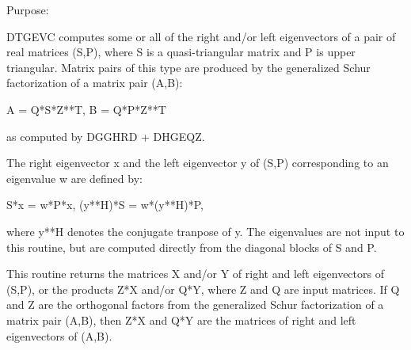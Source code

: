  \begin{DoxyParagraph}{Purpose\+: }
\begin{DoxyVerb} DTGEVC computes some or all of the right and/or left eigenvectors of
 a pair of real matrices (S,P), where S is a quasi-triangular matrix
 and P is upper triangular.  Matrix pairs of this type are produced by
 the generalized Schur factorization of a matrix pair (A,B):

    A = Q*S*Z**T,  B = Q*P*Z**T

 as computed by DGGHRD + DHGEQZ.

 The right eigenvector x and the left eigenvector y of (S,P)
 corresponding to an eigenvalue w are defined by:
 
    S*x = w*P*x,  (y**H)*S = w*(y**H)*P,
 
 where y**H denotes the conjugate tranpose of y.
 The eigenvalues are not input to this routine, but are computed
 directly from the diagonal blocks of S and P.
 
 This routine returns the matrices X and/or Y of right and left
 eigenvectors of (S,P), or the products Z*X and/or Q*Y,
 where Z and Q are input matrices.
 If Q and Z are the orthogonal factors from the generalized Schur
 factorization of a matrix pair (A,B), then Z*X and Q*Y
 are the matrices of right and left eigenvectors of (A,B).\end{DoxyVerb}
 
\end{DoxyParagraph}

